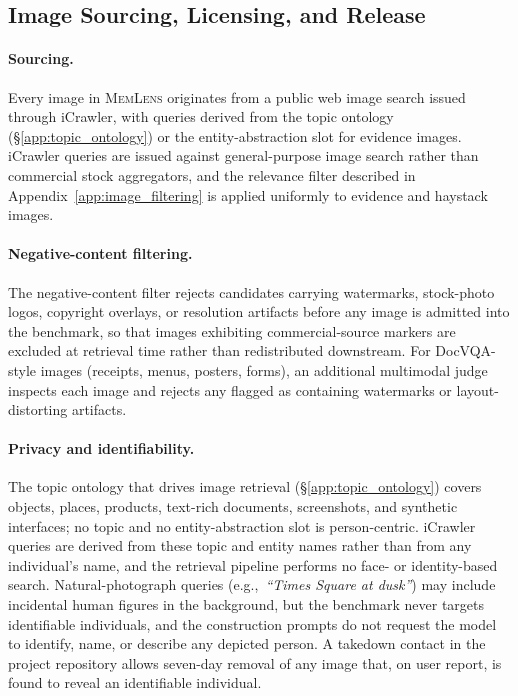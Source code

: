 \documentclass{article}
\newcommand{\bench}{\textsc{MemLens}}
\begin{document}
\subsection{Image Sourcing, Licensing, and Release}
\label{app:image_release}

\paragraph{Sourcing.}
Every image in \bench{} originates from a public web image search issued through iCrawler, with queries derived from the topic ontology (\S\ref{app:topic_ontology}) or the entity-abstraction slot for evidence images. iCrawler queries are issued against general-purpose image search rather than commercial stock aggregators, and the relevance filter described in Appendix~\ref{app:image_filtering} is applied uniformly to evidence and haystack images.

\paragraph{Negative-content filtering.}
The negative-content filter rejects candidates carrying watermarks, stock-photo logos, copyright overlays, or resolution artifacts before any image is admitted into the benchmark, so that images exhibiting commercial-source markers are excluded at retrieval time rather than redistributed downstream. For DocVQA-style images (receipts, menus, posters, forms), an additional multimodal judge~\cite{openai2023gpt4v} inspects each image and rejects any flagged as containing watermarks or layout-distorting artifacts.

\paragraph{Privacy and identifiability.}
The topic ontology that drives image retrieval (\S\ref{app:topic_ontology}) covers objects, places, products, text-rich documents, screenshots, and synthetic interfaces; no topic and no entity-abstraction slot is person-centric. iCrawler queries are derived from these topic and entity names rather than from any individual's name, and the retrieval pipeline performs no face- or identity-based search. Natural-photograph queries (e.g.,~\textit{``Times Square at dusk''}) may include incidental human figures in the background, but the benchmark never targets identifiable individuals, and the construction prompts do not request the model to identify, name, or describe any depicted person. A takedown contact in the project repository allows seven-day removal of any image that, on user report, is found to reveal an identifiable individual.
\end{document}
